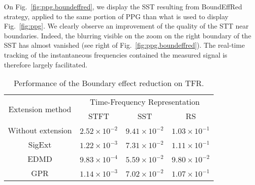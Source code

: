 On Fig.~\ref{fig:ppg.boundeffred}, we display the SST resulting from {\sf BoundEffRed} strategy, applied to the same portion of PPG than what is used to display Fig.~\ref{fig:ppg}. We clearly observe an improvement of the quality of the STT near boundaries. Indeed, the blurring visible on the zoom on the right boundary of the SST has almost vanished (see right of Fig.~\ref{fig:ppg.boundeffred}). The real-time tracking of the instantaneous frequencies contained the measured signal is therefore largely facilitated.    

\begin{table}
\centering
\caption{Performance of the Boundary effect reduction on TFR.}
\begin{tabular}{|c||c|c|c|}
  \hline
   \multirow{2}{*}{Extension method} & \multicolumn{3}{c|}{Time-Frequency Representation} \\
   \cline{2-4}
      & STFT & SST & RS\\
   \hhline{|=#=|=|=|}
   Without extension & $2.52\times 10^{-2}$ & $9.41\times 10^{-2}$ & $1.03\times 10^{-1}$ \\
   \hline
   {\sf SigExt} & $1.22\times 10^{-3}$ & $7.31\times 10^{-2}$ & $1.11\times 10^{-1}$ \\
   \hline
   EDMD & $9.83\times 10^{-4}$ & $5.59\times 10^{-2}$ & $9.80\times 10^{-2}$ \\
   \hline
   GPR & $1.14\times 10^{-3}$ & $7.02\times 10^{-2}$ & $1.07\times 10^{-1}$ \\
   \hline
\end{tabular}
\label{tab:otd.ppg}
\end{table}